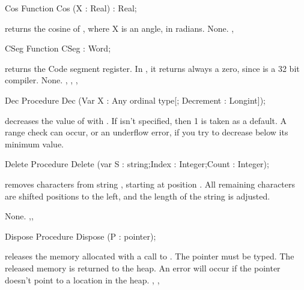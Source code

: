 \documentclass{report}
\begin{document}
\html{}
\begin{function}{Cos}
\Declaration
Function Cos (X : Real) : Real;

\Description
{} returns the cosine of , where X is an angle, in radians.
\Errors
None.
\SeeAlso
{}, 
\end{function}
\html{}
\begin{function}{CSeg}
\Declaration
Function CSeg  : Word;

\Description
{} returns the Code segment register. In \fpc, it returns always a
zero, since \fpc is a 32 bit compiler.
\Errors
None.
\SeeAlso
{}, , , 
\end{function}
\html{}
\begin{procedure}{Dec}
\Declaration
Procedure Dec (Var X : Any ordinal type[; Decrement : Longint]);

\Description
{} decreases the value of  with .
If  isn't specified, then 1 is taken as a default.
\Errors
A range check can occur, or an underflow error, if you try to decrease 
below its minimum value.
\SeeAlso
{}
\end{procedure}
\html{}
\begin{procedure}{Delete}
\Declaration
Procedure Delete (var S : string;Index : Integer;Count : Integer);

\Description
{} removes  characters from string , starting
at position . All remaining characters are shifted  
positions to the left, and the length of the string is adjusted.

\Errors
None.
\SeeAlso
{},,
\end{procedure}
\html{}
\begin{procedure}{Dispose}
\Declaration
Procedure Dispose (P : pointer);

\Description
{} releases the memory allocated with a call to .
The pointer  must be typed. The released memory is returned to the
heap.
\Errors
An error will occur if the pointer doesn't point to a location in the
heap.
\SeeAlso
{}, , 
\end{procedure}
\end{document}
